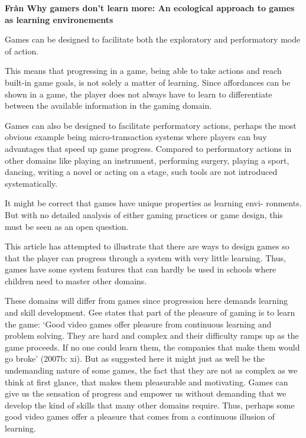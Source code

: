 \textbf{Från Why gamers don't learn more: An ecological approach to games as learning environements}

Games can be designed to facilitate both the exploratory and performatory mode of action.

This means that progressing in a game, being able to take actions and reach built-in game goals, is not solely a matter of learning. Since affordances can be shown in a game, the player does not always have to learn to differentiate between the available information in the gaming domain.

Games can also be designed to facilitate performatory actions, perhaps the most obvious example being micro-transaction systems where players can buy advantages that speed up game progress. Compared to performatory actions in other domains like playing an instrument, performing surgery, playing a sport, dancing, writing a novel or acting on a stage, such tools are not introduced systematically.

It might be correct that games have unique properties as learning envi- ronments. But with no detailed analysis of either gaming practices or game design, this must be seen as an open question.

This article has attempted to illustrate that there are ways to design games so that the player can progress through a system with very little learning. Thus, games have some system features that can hardly be used in schools where children need to master other domains.

These domains will differ from games since progression here demands learning and skill development. Gee states that part of the pleasure of gaming is to learn the game: ‘Good video games offer pleasure from continuous learning and problem solving. They are hard and complex and their difficulty ramps up as the game proceeds. If no one could learn them, the companies that make them would go broke’ (2007b: xi). But as suggested here it might just as well be the undemanding nature of some games, the fact that they are not as complex as we think at first glance, that makes them pleasurable and motivating. Games can give us the sensation of progress and empower us without demanding that we develop the kind of skills that many other domains require. Thus, perhaps some good video games offer a pleasure that comes from a continuous illusion of learning.
